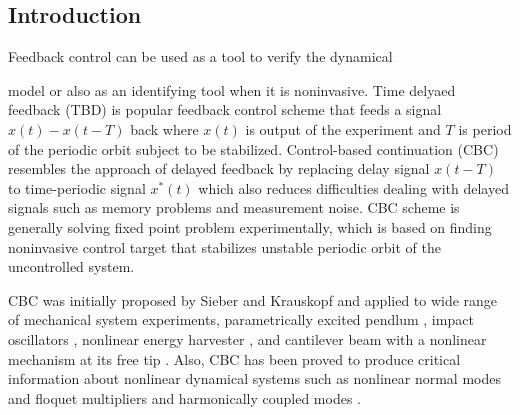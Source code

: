 \documentclass[openacc]{rsproca_new}%
\begin{document}

\begin{fmtext}
\section{Introduction}\label{int}
Feedback control can be used as a tool to verify the dynamical
\end{fmtext}


\maketitle
\noindent model or also as an identifying tool when it is noninvasive. Time delyaed feedback (TBD) \cite{pyragas2006delayed,sieber2016generic} is popular feedback control scheme that feeds a signal $x(t)-x(t-T)$ back where $x(t)$ is output of the experiment and $T$ is period of the periodic orbit subject to be stabilized. Control-based continuation (CBC) resembles the approach of delayed feedback by replacing delay signal $x(t-T)$ to time-periodic signal $x^*(t)$ which also reduces difficulties dealing with delayed signals such as memory problems and measurement noise. CBC scheme is generally solving fixed point problem experimentally, which is based on finding noninvasive control target that stabilizes unstable periodic orbit of the uncontrolled system.

CBC was initially proposed by Sieber and Krauskopf \cite{sieber2008control} and applied to wide range of mechanical system experiments, parametrically excited pendlum \cite{sieber2011control}, impact oscillators \cite{bureau2013experimental,bureau2014experimental}, nonlinear energy harvester \cite{barton2013systematic,barton2011numerical}
, and cantilever beam with a nonlinear mechanism at its free tip \cite{renson2019application}. Also, CBC has been proved to produce critical information about nonlinear dynamical systems such as nonlinear normal modes \cite{renson2016robust,renson2016experimental} and floquet multipliers \cite{barton2017control} and harmonically coupled modes \cite{renson2019application}.
\end{document}

